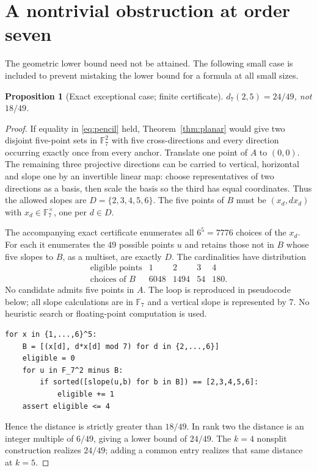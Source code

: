 \documentclass[11pt]{article}
\newtheorem{proposition}[theorem]{Proposition}
\theoremstyle{remark}\newtheorem{remark}[theorem]{Remark}
\newcommand{\F}{\mathbb F}
\begin{document}
\section{A nontrivial obstruction at order seven}
The geometric lower bound need not be attained. The following small case is included to prevent mistaking the lower bound for a formula at all small sizes.
\begin{proposition}[Exact exceptional case; finite certificate]\label{prop:seven}
$d_7(2,5)=24/49$, not $18/49$.
\end{proposition}
\begin{proof}
If equality in \eqref{eq:pencil} held, Theorem~\ref{thm:planar} would give two disjoint five-point sets in $\F_7^2$ with five cross-directions and every direction occurring exactly once from every anchor. Translate one point of $A$ to $(0,0)$. The remaining three projective directions can be carried to vertical, horizontal and slope one by an invertible linear map: choose representatives of two directions as a basis, then scale the basis so the third has equal coordinates. Thus the allowed slopes are $D=\{2,3,4,5,6\}$. The five points of $B$ must be $(x_d,dx_d)$ with $x_d\in\F_7^\times$, one per $d\in D$.

The accompanying exact certificate enumerates all $6^5=7776$ choices of the $x_d$. For each it enumerates the 49 possible points $u$ and retains those not in $B$ whose five slopes to $B$, as a multiset, are exactly $D$. The cardinalities have distribution
\[
\begin{array}{c|rrrr}
\text{eligible points}&1&2&3&4\\\hline
\text{choices of }B&6048&1494&54&180.
\end{array}
\]
No candidate admits five points in $A$. The loop is reproduced in pseudocode below; all slope calculations are in $\F_7$ and a vertical slope is represented by 7. No heuristic search or floating-point computation is used.
\begin{verbatim}
for x in {1,...,6}^5:
    B = [(x[d], d*x[d] mod 7) for d in {2,...,6}]
    eligible = 0
    for u in F_7^2 minus B:
        if sorted([slope(u,b) for b in B]) == [2,3,4,5,6]:
            eligible += 1
    assert eligible <= 4
\end{verbatim}
Hence the distance is strictly greater than $18/49$. In rank two the distance is an integer multiple of $6/49$, giving a lower bound of $24/49$. The $k=4$ nonsplit construction realizes $24/49$; adding a common entry realizes that same distance at $k=5$.
\end{proof}
\end{document}
